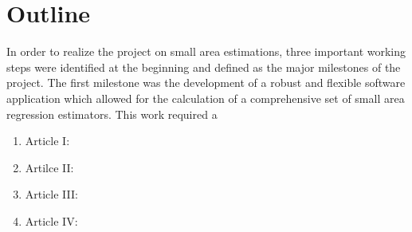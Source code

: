 \section{Outline}
\label{sec:intro:outline}

In order to realize the project on small area estimations, three important working steps were identified at the beginning and defined as the major milestones of the project. The first milestone was the development of a robust and flexible software application which allowed for the calculation of a comprehensive set of small area regression estimators. This work required a 



% 
















\begin{enumerate}
	\item Article I:
	\item Artilce II:
	\item Article III:
	\item Article IV:
\end{enumerate}


%
%
%
%
%
%
%
%
%
%
%
%
%
%















